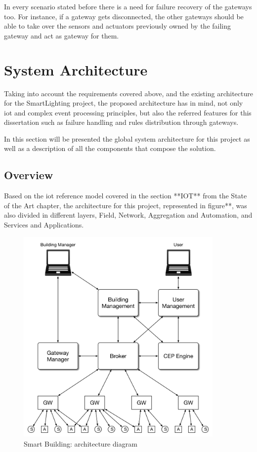 In every scenario stated before there is a need for failure recovery of the gateways too. For instance, if a gateway gets disconnected, the other gateways should be able to take over the sensors and actuators previously owned by the failing gateway and act as gateway for them.

\section{System Architecture}
\label{Architecture:Architecture}


Taking into account the requirements covered above, and the existing architecture for the SmartLighting project, the proposed architecture has in mind, not only \ac{iot} and complex event processing principles, but also the referred features for this dissertation such as failure handling and rules distribution through gateways.

In this section will be presented the global system architecture for this project as well as a description of all the components that compose the solution.

\subsection{Overview}

Based on the \ac{iot} reference model covered in the section **IOT** from the State of the Art chapter, the architecture for this project, represented in figure**, was also divided in different layers, Field, Network, Aggregation and Automation, and Services and Applications.

	\begin{figure}[H]
	\centering
	\includegraphics[width=0.9\textwidth]{figures/architecture.png}
	\caption{Smart Building: architecture diagram}
	\label{fig:arch}
\end{figure}

